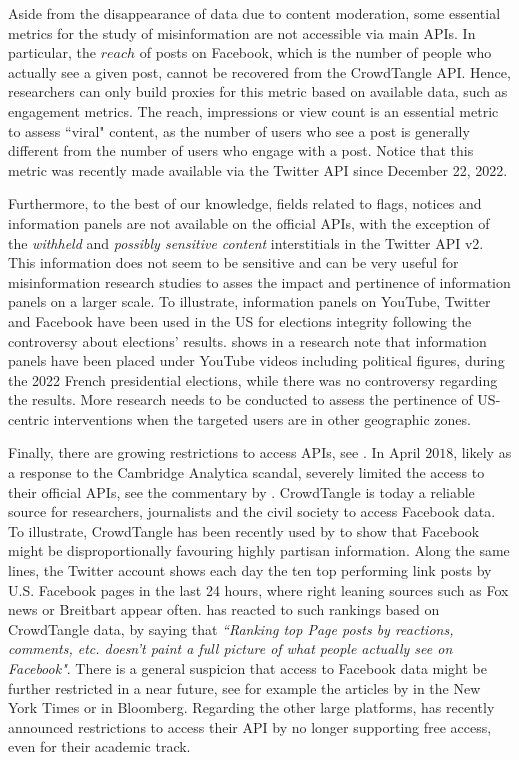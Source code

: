 \documentclass[Afour,sageh,times]{sagej}
\begin{document}
Aside from the disappearance of data due to content moderation, some essential metrics for the study of misinformation are not accessible via main APIs. 
In particular, the $reach$ of posts on Facebook, which is the number of people who actually see a given post, cannot be recovered from the CrowdTangle API. Hence, researchers can only build proxies for this metric based on available data, such as engagement metrics. The reach, impressions or view count is an essential metric to assess ``viral" content, as the number of users who see a post is generally different from the number of users who engage with a post.  Notice that this metric was recently made available via the Twitter API since December 22, 2022. 

Furthermore, to the best of our knowledge, fields related to flags, notices and information panels are not available on the official APIs, with the exception of the {\it withheld}  and {\it possibly sensitive content} interstitials in the Twitter API v2. This information does not seem to be sensitive and can be very useful for misinformation research studies to asses the impact and pertinence of information panels on a larger scale. To illustrate, information panels on YouTube, Twitter and Facebook have been used in the US for elections integrity following the controversy about elections' results. \cite{therodefacto} shows in a research note that information panels have been placed under YouTube videos including political figures, during the 2022 French presidential elections, while there was no controversy regarding the results. More research needs to be conducted to assess the pertinence of US-centric interventions when the targeted users are in other geographic zones.  

Finally, there are growing restrictions to access APIs, see \cite{api}.
In April $2018$, likely as a response to the Cambridge Analytica scandal, \cite{facebookdata} severely limited the access to their official APIs, see the commentary by \cite{bernhard}.  
CrowdTangle is today a reliable source for researchers, journalists and the civil society to access Facebook data. 
To illustrate, CrowdTangle has been recently used by \cite{theeconomist} to show that Facebook might be disproportionally favouring highly partisan information. Along the same lines, the Twitter account \cite{facebookstop10} shows each day the ten top performing link posts by U.S. Facebook pages in the last 24 hours, where right leaning sources such as Fox news or Breitbart appear often. 
\cite{facebookapptop10} has reacted to such rankings based on CrowdTangle data, by saying that {\it ``Ranking top Page posts by reactions, comments, etc. doesn’t paint a full picture of what people actually see on Facebook"}. There is a general suspicion that access to Facebook data might be further restricted in a near future, see for example the articles by \cite{nytimestheshift} in the New York Times or \cite{bloomberg} in Bloomberg. Regarding the other large platforms, \cite{twitterdev} has recently announced restrictions to access their API by no longer supporting free access, even for their academic track.  
\end{document}
